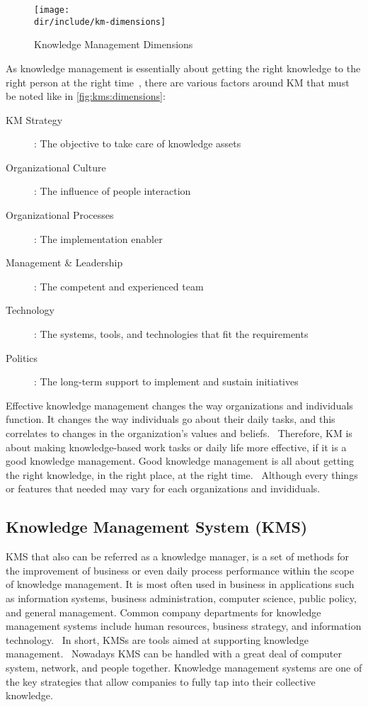 \begin{figure}[htbp]
    \centering
    \texttt{[image: \\dir/include/km-dimensions]}
    \caption{Knowledge Management Dimensions}
    \label{fig:kms:dimensions}
\end{figure}

As knowledge management is essentially about getting the right knowledge to the right person at the right time~\autocite{Frost2010KM}, there are various factors around \ac{KM} that must be noted like in \autoref{fig:kms:dimensions}:

\begin{description}
  \item [KM Strategy]: The objective to take care of knowledge assets
  \item [Organizational Culture]: The influence of people interaction
  \item [Organizational Processes]: The implementation enabler
  \item [Management \& Leadership]: The competent and experienced team
  \item [Technology]: The systems, tools, and technologies that fit the requirements
  \item [Politics]: The long-term support to implement and sustain initiatives
\end{description}

Effective knowledge management changes the way organizations and individuals function.
It changes the way individuals go about their daily tasks, and this correlates to changes in the organization’s values and beliefs.~\autocite{Call2005KM}
Therefore, \ac{KM} is about making knowledge-based work tasks or daily life more effective, if it is a good knowledge management.
Good knowledge management is all about getting the right knowledge, in the right place, at the right time.~\autocite{Brun:2015:ABCKM:6}
Although every things or features that needed may vary for each organizations and invididuals.

\subsection{Knowledge Management System (KMS)}

\ac{KMS} that also can be referred as a knowledge manager, is a set of methods for the improvement of business or even daily process performance within the scope of knowledge management.
It is most often used in business in applications such as information systems, business administration, computer science, public policy, and general management.
Common company departments for knowledge management systems include human resources, business strategy, and information technology.~\autocite{BD2015KMS}
In short, \ac{KMS}s are tools aimed at supporting knowledge management.~\autocite{Dalkir2005KM}
Nowadays \ac{KMS} can be handled with a great deal of computer system, network, and people together.
Knowledge management systems are one of the key strategies that allow companies to fully tap into their collective knowledge.~\autocite{Panela2011mikrow}

